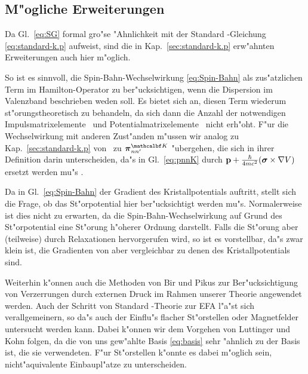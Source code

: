 \subsection{M"ogliche Erweiterungen}
\label{sec:erweiterungen}

Da Gl.~\eqref{eq:SG} formal gro"se "Ahnlichkeit mit der Standard
\kdotp-Gleichung \eqref{eq:standard-k.p} aufweist, sind die in
Kap.~\ref{sec:standard-k.p} erw"ahnten Erweiterungen auch hier m"oglich.

So ist es sinnvoll, die Spin-Bahn-Wechselwirkung \eqref{eq:Spin-Bahn} als
zus"atzlichen Term im Hamilton-Operator zu ber"ucksichtigen, wenn die
Dispersion im Valenzband beschrieben weden soll. Es bietet sich an, diesen
Term wiederum st"orungstheoretisch zu behandeln, da sich dann die Anzahl der
notwendigen Impulsmatrixelemente \pnnK\ und Potentialmatrixelemente \VnnKK\ 
nicht erh"oht.  F"ur die Wechselwirkung mit anderen Zust"anden m"ussen wir
analog zu Kap.~\ref{sec:standard-k.p} von \pnnK\ zu
$\grvec{\pi}^{\set}_{\mathnormal{n\pri{n}}}$ "ubergehen, die sich in ihrer
Definition darin unterscheiden, da"s in Gl.~\eqref{eq:pnnK} \vecop{p} durch
$\vecop{p} + \frac{\hbar}{4mc^{2}} (\grvecop{\sigma} \times \nabla\op{V})$
ersetzt werden mu"s \cite{luko:55}.

Da in Gl.~\eqref{eq:Spin-Bahn} der Gradient des Kristallpotentials 
auftritt, stellt sich die Frage, ob das St"orpotential \op{H_{1}} hier
ber"ucksichtigt werden mu"s. Normalerweise ist dies nicht zu erwarten, da die
Spin-Bahn-Wechselwirkung auf Grund des St"orpotential  eine St"orung
h"oherer Ordnung darstellt. Falls die St"orung  aber (teilweise)
durch Relaxationen hervorgerufen wird, so ist es vorstellbar, da"s 
zwar klein ist, die Gradienten von \op{H_{1}} aber vergleichbar zu denen des
Kristallpotentials sind.

Weiterhin k"onnen auch die Methoden von Bir und Pikus \cite{bipi:74} zur
Ber"ucksichtigung von Verzerrungen durch externen Druck im Rahmen unserer
Theorie angewendet werden. Auch der Schritt von Standard \kdotp-Theorie zur
EFA l"a"st sich verallgemeinern, so da"s auch der Einflu"s flacher St"orstellen
oder Magnetfelder untersucht werden kann. Dabei k"onnen wir dem Vorgehen von
Luttinger und Kohn \cite{luko:55} folgen, da die von uns gew"ahlte Basis
\eqref{eq:basis} sehr "ahnlich zu der Basis ist, die sie verwendeten. F"ur
St"orstellen k"onnte es dabei m"oglich sein, nicht"aquivalente Einbaupl"atze
zu unterscheiden.


